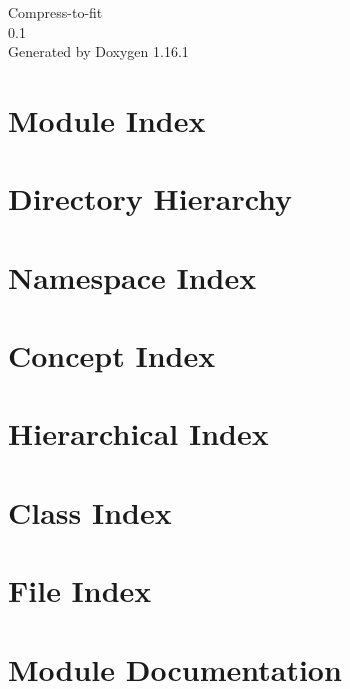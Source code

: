 \documentclass[twoside]{book}
\newcommand{\+}{\discretionary{\mbox{\scriptsize$\hookleftarrow$}}{}{}}
\newcommand{\clearemptydoublepage}{%
    \newpage{\pagestyle{empty}\cleardoublepage}%
  }
\begin{document}
  \raggedbottom
    \hypersetup{pageanchor=false,
                bookmarksnumbered=true,
                pdfencoding=unicode
               }
  \begin{titlepage}
  \vspace*{7cm}
  \begin{center}%
  {\Large Compress-\/to-\/fit}\\
  [1ex]\large 0.\+1 \\
  \vspace*{1cm}
  {\large Generated by Doxygen 1.16.1}\\
  \end{center}
  \end{titlepage}
  \clearemptydoublepage
  \tableofcontents
  \clearemptydoublepage
  \hypersetup{pageanchor=true}

\chapter{Module Index}

\chapter{Directory Hierarchy}

\chapter{Namespace Index}

\chapter{Concept Index}

\chapter{Hierarchical Index}

\chapter{Class Index}

\chapter{File Index}

\chapter{Module Documentation}




\end{document}
